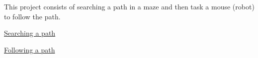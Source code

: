 This project consists of searching a path in a maze and then task a mouse (robot) to follow the path.
\begin{DoxyItemize}
\item \hyperlink{searchingPathPage}{Searching a path}
\item \hyperlink{followingPathPage}{Following a path} 
\end{DoxyItemize}